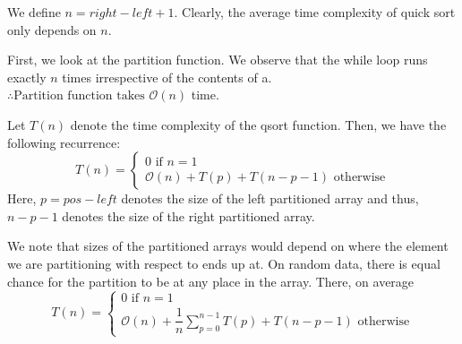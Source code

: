 \documentclass[answers]{exam}
\renewcommand{\O}[1]{\mathcal{O}\left(#1\right)}
\begin{document}
\begin{questions}
\begin{solution}
            We define \(n = right - left + 1\). Clearly, the average time complexity of
            quick sort only depends on \(n\).

            First, we look at the partition function. We observe that the while loop runs exactly
            \(n\) times irrespective of the contents of a.\\
             \(\therefore \text{Partition function takes } \O{n} \) time.

            Let \(T(n)\) denote the time complexity of the qsort function.
            Then, we have the following recurrence:
            \begin{equation*}
                T(n) =
                \begin{cases}
                    0 \text{ if } n = 1 \\
                    \O{n} + T(p) + T(n - p - 1) \text{ otherwise}
                \end{cases}
            \end{equation*}
            Here, \(p = pos - left\) denotes the size of the left partitioned array and
            thus, \(n - p - 1\) denotes the size of the right partitioned array.

            We note that sizes of the partitioned arrays would depend on where the element we are
            partitioning with respect to ends up at.
            On random data, there is equal chance for the partition to be at any place in the array.
            There, on average
            \begin{equation*}
                T(n) =
                \begin{cases}
                    0 \text{ if } n = 1 \\
                    \O{n} + \dfrac{1}{n}\displaystyle
                    \sum_{p=0}^{n-1}{T(p) + T(n - p - 1)} \text{ otherwise}
                \end{cases}
            \end{equation*}


\end{solution}
\end{questions}
\end{document}
